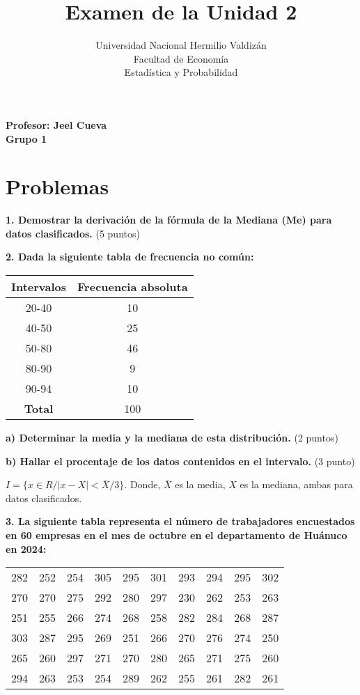 \documentclass[12pt]{article}
\title{Examen de la Unidad 2}
\author{Universidad Nacional Hermilio Valdizán \\ Facultad de Economía \\ Estadística y Probabilidad}
\date{}
\begin{document}
\maketitle

\begin{center}
\textbf{Profesor: Jeel Cueva} \\ 
\textbf{Grupo 1}
\end{center}

\section*{Problemas}

\textbf{1. Demostrar la derivación de la fórmula de la Mediana (Me) para datos clasificados.} (5 puntos)

\vspace{1cm}

\textbf{2. Dada la siguiente tabla de frecuencia no común:}

\begin{center}
\begin{tabular}{|c|c|}
\hline
\textbf{Intervalos} & \textbf{Frecuencia absoluta} \\
\hline
20-40 & 10 \\
40-50 & 25 \\
50-80 & 46 \\
80-90 & 9 \\
90-94 & 10 \\
\hline
\textbf{Total} & 100 \\
\hline
\end{tabular}
\end{center}

\textbf{a) Determinar la media y la mediana de esta distribución.} (2 puntos)

\textbf{b) Hallar el procentaje de los datos contenidos en el intervalo.} (3 punto)

$I = \{ x \in R / |x - X|< \bar{X}/3  \}$. Donde, $\bar{X}$ es la media, $X$ es la mediana, ambas para datos clasificados.

\vspace{1cm}

\textbf{3. La siguiente tabla representa el número de trabajadores encuestados en 60 empresas en el mes de octubre en el departamento de Huánuco en 2024:}

\begin{center}
\begin{tabular}{|c|c|c|c|c|c|c|c|c|c|}
\hline
282 & 252 & 254 & 305 & 295 & 301 & 293 & 294 & 295 & 302\\
270 & 270 & 275 & 292 & 280 & 297 & 230 & 262 & 253 & 263\\
251 & 255 & 266 & 274 & 268 & 258 & 282 & 284 & 268 & 287\\
303 & 287 & 295 & 269 & 251 & 266 & 270 & 276 & 274 & 250\\
265 & 260 & 297 & 271 & 270 & 280 & 265 & 271 & 275 & 260\\
294 & 263 & 253 & 254 & 289 & 262 & 255 & 261 & 282 & 261\\
\hline
\end{tabular}
\end{center}
\end{document}
